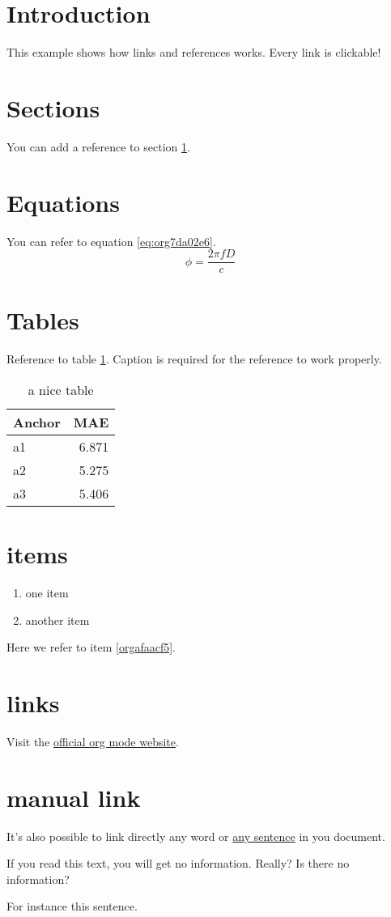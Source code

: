 


\section{Introduction}
\label{sec:org000cb94}
This example shows how links and references works.
Every link is clickable!

\section{Sections}
\label{sec:orgbcef7a5}
You can add a reference to section \ref{sec:org000cb94}.

\section{Equations}
\label{sec:org30147a6}
You can refer to equation \ref{eq:org7da02e6}.
\begin{equation}
\label{eq:org7da02e6}
\phi = \frac{2\pi fD}{c}
\end{equation}

\section{Tables}
\label{sec:org4649302}
Reference to table \ref{tab:orgb821d85}.
Caption is required for the reference to work properly.

\begin{table}[htbp]
\caption{\label{tab:orgb821d85}
a nice table}
\centering
\begin{tabular}{lr}
Anchor & MAE\\
\hline
a1 & 6.871\\
a2 & 5.275\\
a3 & 5.406\\
\end{tabular}
\end{table}

\section{items}
\label{sec:org13e371b}
\begin{enumerate}
\item one item
\item \label{orgafaacf5}another item
\end{enumerate}
Here we refer to item \ref{orgafaacf5}.

\section{links}
\label{sec:org14f7fa1}
Visit the \href{https://orgmode.org/}{official org mode website}.

\section{manual link}
\label{sec:orgc8a2e63}
It's also possible to link directly any word
or \hyperlink{thesentence}{any sentence} in you document.

If you read this text, you will get no information.  Really?
Is there no information?

For instance \hypertarget{thesentence}{this sentence}.


